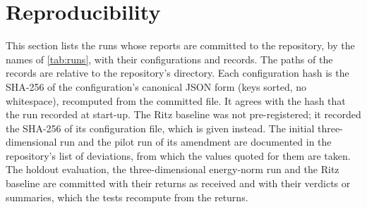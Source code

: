 \section{Reproducibility}\label{app:repro}

This section lists the runs whose reports are committed to the repository, by the names of
\cref{tab:runs}, with their configurations and records. The paths of the records are relative to the repository's  directory. Each configuration hash is the
SHA-256 of the configuration's canonical JSON form (keys sorted, no whitespace), recomputed from the committed file. It agrees with the hash that the run recorded at start-up. The
Ritz baseline was not pre-registered; it recorded the SHA-256 of its configuration file,
which is given instead. The initial three-dimensional run and the pilot run of its amendment
are documented in the repository's list of deviations, from which the values quoted for
them are taken. The holdout evaluation, the three-dimensional energy-norm run and the
Ritz baseline are committed with their returns as received and with their verdicts or
summaries, which the tests recompute from the returns.



